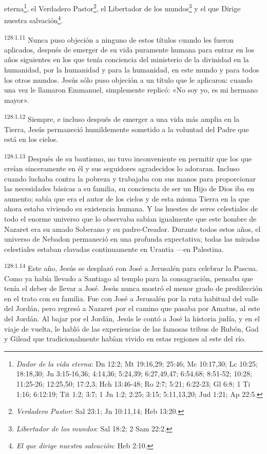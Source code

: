 eterna\footnote{\textit{Dador de la vida eterna}: Dn 12:2; Mt 19:16,29; 25:46; Mc 10:17,30; Lc 10:25; 18:18,30; Jn 3:15-16,36; 4:14,36; 5:24,39; 6:27,49,47; 6:54,68; 8:51-52; 10:28; 11:25-26; 12:25,50; 17:2,3; Hch 13:46-48; Ro 2:7; 5:21; 6:22-23; Gl 6:8; 1 Ti 1:16; 6:12:19; Tit 1:2; 3:7; 1 Jn 1:2; 2:25; 3:15; 5:11,13,20; Jud 1:21; Ap 22:5.}, el Verdadero Pastor\footnote{\textit{Verdadero Pastor}: Sal 23:1; Jn 10:11,14; Heb 13:20.}, el Libertador de los mundos\footnote{\textit{Libertador de los mundos}: Sal 18:2; 2 Sam 22:2.} y el que Dirige nuestra salvación\footnote{\textit{El que dirige nuestra salvación}: Heb 2:10.}.

\par
\textsuperscript{128:1.11} Nunca puso objeción a ninguno de estos títulos cuando les fueron aplicados, después de emerger de su vida puramente humana para entrar en los años siguientes en los que tenía conciencia del ministerio de la divinidad en la humanidad, por la humanidad y para la humanidad, en este mundo y para todos los otros mundos. Jesús sólo puso objeción a un título que le aplicaron: cuando una vez le llamaron Emmanuel, simplemente replicó: «No soy yo, es mi hermano mayor».

\par
\textsuperscript{128:1.12} Siempre, e incluso después de emerger a una vida más amplia en la Tierra, Jesús permaneció humildemente sometido a la voluntad del Padre que está en los cielos.

\par
\textsuperscript{128:1.13} Después de su bautismo, no tuvo inconveniente en permitir que los que creían sinceramente en él y sus seguidores agradecidos lo adoraran. Incluso cuando luchaba contra la pobreza y trabajaba con sus manos para proporcionar las necesidades básicas a su familia, su conciencia de ser un Hijo de Dios iba en aumento; sabía que era el autor de los cielos y de esta misma Tierra en la que ahora estaba viviendo su existencia humana. Y las huestes de seres celestiales de todo el enorme universo que lo observaba sabían igualmente que este hombre de Nazaret era su amado Soberano y su padre-Creador. Durante todos estos años, el universo de Nebadon permaneció en una profunda expectativa; todas las miradas celestiales estaban clavadas continuamente en Urantia ---en Palestina.

\par
\textsuperscript{128:1.14} Este año, Jesús se desplazó con José a Jerusalén para celebrar la Pascua. Como ya había llevado a Santiago al templo para la consagración, pensaba que tenía el deber de llevar a José. Jesús nunca mostró el menor grado de predilección en el trato con su familia. Fue con José a Jerusalén por la ruta habitual del valle del Jordán, pero regresó a Nazaret por el camino que pasaba por Amatus, al este del Jordán. Al bajar por el Jordán, Jesús le contó a José la historia judía, y en el viaje de vuelta, le habló de las experiencias de las famosas tribus de Rubén, Gad y Gilead que tradicionalmente habían vivido en estas regiones al este del río.

